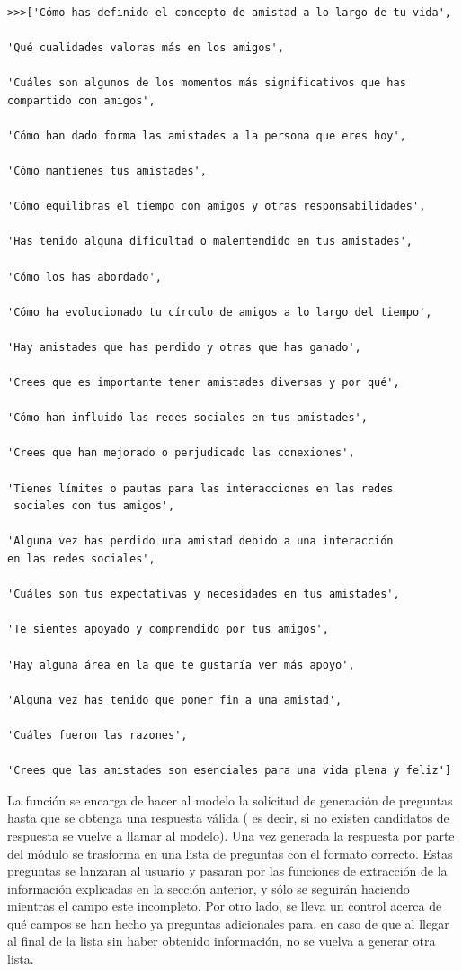 \begin{verbatim}

>>>['Cómo has definido el concepto de amistad a lo largo de tu vida',

'Qué cualidades valoras más en los amigos',

'Cuáles son algunos de los momentos más significativos que has 
compartido con amigos',

'Cómo han dado forma las amistades a la persona que eres hoy',

'Cómo mantienes tus amistades',

'Cómo equilibras el tiempo con amigos y otras responsabilidades',

'Has tenido alguna dificultad o malentendido en tus amistades',

'Cómo los has abordado',

'Cómo ha evolucionado tu círculo de amigos a lo largo del tiempo',

'Hay amistades que has perdido y otras que has ganado',

'Crees que es importante tener amistades diversas y por qué',

'Cómo han influido las redes sociales en tus amistades',

'Crees que han mejorado o perjudicado las conexiones',

'Tienes límites o pautas para las interacciones en las redes
 sociales con tus amigos',
 
'Alguna vez has perdido una amistad debido a una interacción 
en las redes sociales',

'Cuáles son tus expectativas y necesidades en tus amistades',

'Te sientes apoyado y comprendido por tus amigos',

'Hay alguna área en la que te gustaría ver más apoyo',

'Alguna vez has tenido que poner fin a una amistad',

'Cuáles fueron las razones',

'Crees que las amistades son esenciales para una vida plena y feliz']

\end{verbatim}

La función se encarga de hacer al modelo la solicitud de generación de preguntas hasta que se obtenga una respuesta válida ( es decir, si no existen candidatos de respuesta se vuelve a llamar al modelo). Una vez generada la respuesta por parte del módulo se trasforma en una lista de preguntas con el formato correcto. Estas preguntas se lanzaran al usuario y pasaran por las funciones de extracción de la información explicadas en la sección anterior, y sólo se seguirán haciendo mientras el campo este incompleto. Por otro lado, se lleva un control acerca de qué campos se han hecho ya preguntas adicionales para, en caso de que al llegar al final de la lista sin haber obtenido información, no se vuelva a generar otra lista. 
